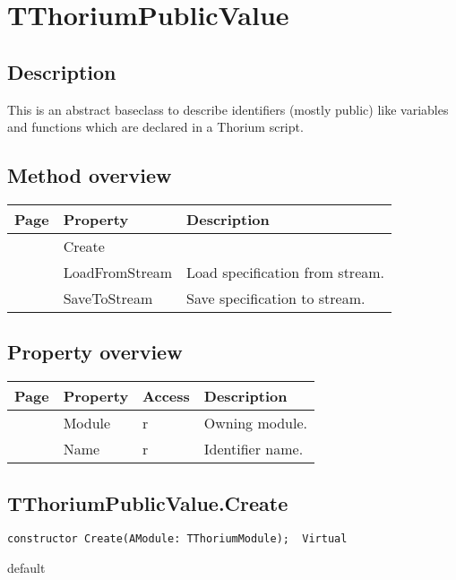 \section{TThoriumPublicValue}
\label{thoriumcorepkg:thorium:tthoriumpublicvalue}
\subsection{Description}
This is an abstract baseclass to describe identifiers (mostly public) like variables and functions which are declared in a Thorium script.%
\subsection{Method overview}
\label{thoriumcorepkg:thorium:tthoriumpublicvalue:methods}
\begin{tabularx}{\textwidth}{llX}
Page & Property & Description  \\ \hline
\pageref{thoriumcorepkg:thorium:tthoriumpublicvalue:create} & Create  &  \\
\pageref{thoriumcorepkg:thorium:tthoriumpublicvalue:loadfromstream} & LoadFromStream  & Load specification from stream. \\
\pageref{thoriumcorepkg:thorium:tthoriumpublicvalue:savetostream} & SaveToStream  & Save specification to stream. \\
\hline
\end{tabularx}
\subsection{Property overview}
\label{thoriumcorepkg:thorium:tthoriumpublicvalue:properties}
\begin{tabularx}{\textwidth}{lllX}
Page & Property & Access & Description \\ \hline
\pageref{thoriumcorepkg:thorium:tthoriumpublicvalue:module} & Module & r & Owning module. \\
\pageref{thoriumcorepkg:thorium:tthoriumpublicvalue:name} & Name & r & Identifier name. \\
\hline
\end{tabularx}
\subsection{TThoriumPublicValue.Create}
\label{thoriumcorepkg:thorium:tthoriumpublicvalue:create}
\begin{FPCList}
\Declaration 

\begin{verbatim}
constructor Create(AModule: TThoriumModule);  Virtual
\end{verbatim}
\Visibility
default
\end{FPCList}
